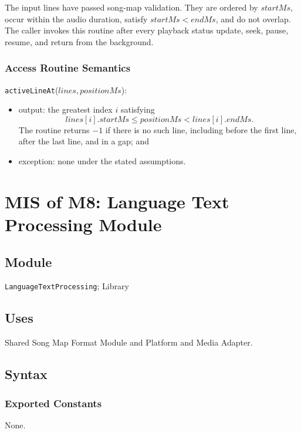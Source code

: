 \documentclass[12pt, titlepage]{article}
\begin{document}
The input lines have passed song-map validation.  They are ordered by
$startMs$, occur within the audio duration, satisfy $startMs < endMs$, and do
not overlap.  The caller invokes this routine after every playback status
update, seek, pause, resume, and return from the background.

\subsubsection{Access Routine Semantics}

\noindent \texttt{activeLineAt}($lines,positionMs$):
\begin{itemize}
  \item output: the greatest index $i$ satisfying
  \[
    lines[i].startMs \leq positionMs < lines[i].endMs.
  \]
  The routine returns
  $-1$ if there is no such line, including before the first line, after the last
  line, and in a gap; and
  \item exception: none under the stated assumptions.
\end{itemize}

\newpage

\section{MIS of M8: Language Text Processing Module} \label{mLanguageText}

\subsection{Module}

\texttt{LanguageTextProcessing}; Library

\subsection{Uses}

Shared Song Map Format Module and Platform and Media Adapter.

\subsection{Syntax}

\subsubsection{Exported Constants}

None.
\end{document}
